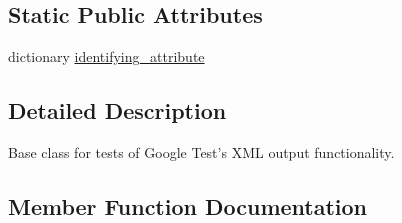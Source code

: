 \subsection*{Static Public Attributes}
\begin{DoxyCompactItemize}
\item 
dictionary \hyperlink{classgtest__xml__test__utils_1_1GTestXMLTestCase_a0e3a4e84e18f29d2248dcd670a0a6ae6}{identifying\+\_\+attribute}
\end{DoxyCompactItemize}


\subsection{Detailed Description}
\begin{DoxyVerb}Base class for tests of Google Test's XML output functionality.
\end{DoxyVerb}
 

\subsection{Member Function Documentation}
